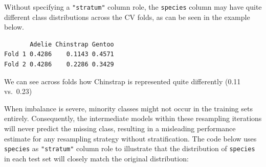 Without specifying a \texttt{"stratum"} column role, the
\texttt{species} column may have quite different class distributions
across the CV folds, as can be seen in the example below.

\begin{Shaded}
\begin{Highlighting}[]
\OtherTok{=} \NormalTok{(}\NormalTok{, } \NormalTok{)}
\SpecialCharTok{$}

\OtherTok{=} \NormalTok{(}\SpecialCharTok{$}\NormalTok{(}\SpecialCharTok{$}\NormalTok{(}\NormalTok{),}
   \NormalTok{)))}
\OtherTok{=} \NormalTok{(}\SpecialCharTok{$}\NormalTok{(}\SpecialCharTok{$}\NormalTok{(}\NormalTok{),}
   \NormalTok{)))}

\NormalTok{(} \OtherTok{=} \OtherTok{=}
\end{Highlighting}
\end{Shaded}

\begin{verbatim}
       Adelie Chinstrap Gentoo
Fold 1 0.4286    0.1143 0.4571
Fold 2 0.4286    0.2286 0.3429
\end{verbatim}

We can see across folds how Chinstrap is represented quite differently
(0.11 vs.~0.23)

When imbalance is severe, minority classes might not occur in the
training sets entirely. Consequently, the intermediate models within
these resampling iterations will never predict the missing class,
resulting in a misleading performance estimate for any resampling
strategy without stratification. The code below uses \texttt{species} as
\texttt{"stratum"} column role to illustrate that the distribution of
\texttt{species} in each test set will closely match the original
distribution:

